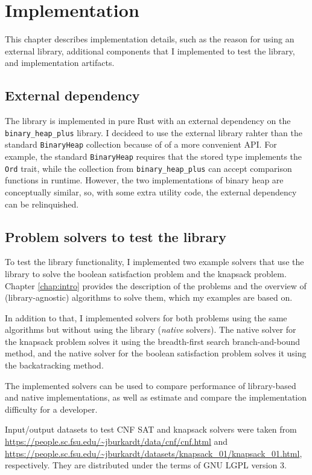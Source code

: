 \chapter{Implementation}
\label{chap:impl}

This chapter describes implementation details, such as the reason for using an external library,
additional components that I implemented to test the library, and implementation artifacts.

\section{External dependency}

The library is implemented in pure Rust with an external dependency on the
\texttt{binary\_heap\_plus} library. I decideed to use the external library rahter than the
standard \texttt{BinaryHeap} collection because of of a more convenient API. For example,
the standard \texttt{BinaryHeap} requires that the stored type implements the \texttt{Ord}
trait, while the collection from \texttt{binary\_heap\_plus} can accept comparison functions in
runtime. However, the two implementations of binary heap are conceptually similar, so, with some
extra utility code, the external dependency can be relinquished.

\section{Problem solvers to test the library}

To test the library functionality, I implemented two example solvers that use the library to
solve the boolean satisfaction problem and the knapsack problem. Chapter \ref{chap:intro}
provides the description of the problems and the overview of (library-agnostic)
algorithms to solve them, which my examples are based on.

In addition to that, I implemented solvers for both problems using the same algorithms
but without using the library (\emph{native} solvers).
The native solver for the knapsack problem solves it using the breadth-first search
branch-and-bound method, and the native solver for the boolean satisfaction problem solves it
using the backatracking method.

The implemented solvers can be used to compare performance of library-based and native
implementations, as well as estimate and compare the implementation difficulty for a developer.

Input/output datasets to test CNF SAT and knapsack solvers were taken from
\url{https://people.sc.fsu.edu/~jburkardt/data/cnf/cnf.html} and
\url{https://people.sc.fsu.edu/~jburkardt/datasets/knapsack_01/knapsack_01.html}, respectively.
They are distributed under the terms of GNU LGPL version 3.

